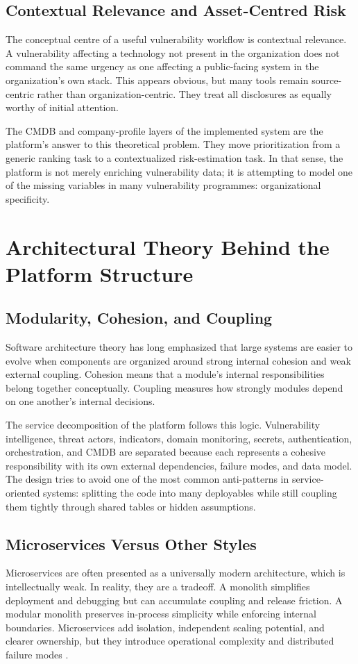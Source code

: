 \subsection{Contextual Relevance and Asset-Centred Risk}
The conceptual centre of a useful vulnerability workflow is contextual relevance. A vulnerability affecting a technology not present in the organization does not command the same urgency as one affecting a public-facing system in the organization's own stack. This appears obvious, but many tools remain source-centric rather than organization-centric. They treat all disclosures as equally worthy of initial attention.

The CMDB and company-profile layers of the implemented system are the platform's answer to this theoretical problem. They move prioritization from a generic ranking task to a contextualized risk-estimation task. In that sense, the platform is not merely enriching vulnerability data; it is attempting to model one of the missing variables in many vulnerability programmes: organizational specificity.

\section{Architectural Theory Behind the Platform Structure}
\subsection{Modularity, Cohesion, and Coupling}
Software architecture theory has long emphasized that large systems are easier to evolve when components are organized around strong internal cohesion and weak external coupling. Cohesion means that a module's internal responsibilities belong together conceptually. Coupling measures how strongly modules depend on one another's internal decisions.

The service decomposition of the platform follows this logic. Vulnerability intelligence, threat actors, indicators, domain monitoring, secrets, authentication, orchestration, and CMDB are separated because each represents a cohesive responsibility with its own external dependencies, failure modes, and data model. The design tries to avoid one of the most common anti-patterns in service-oriented systems: splitting the code into many deployables while still coupling them tightly through shared tables or hidden assumptions.

\subsection{Microservices Versus Other Styles}
Microservices are often presented as a universally modern architecture, which is intellectually weak. In reality, they are a tradeoff. A monolith simplifies deployment and debugging but can accumulate coupling and release friction. A modular monolith preserves in-process simplicity while enforcing internal boundaries. Microservices add isolation, independent scaling potential, and clearer ownership, but they introduce operational complexity and distributed failure modes \cite{microservices_arch}.

